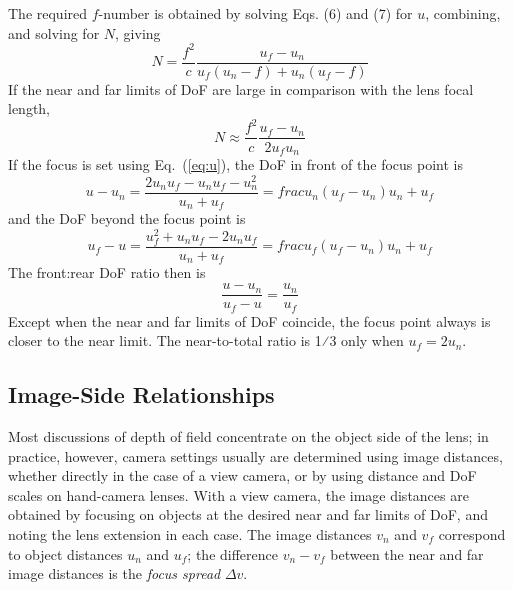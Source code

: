 \documentclass[11pt, oneside]{scrartcl}   	%
\newcommand{\Dv}{\ensuremath{\Delta v}}
\begin{document}
The required $f$-number is obtained by solving Eqs. (6) and (7) for
$u$, combining, and solving for $N$, giving
\begin{equation}
  \label{eq:N}
  N = \frac{f^2}c\frac{u_f - u_n}{u_f(u_n-f)+u_n(u_f-f)}
\end{equation}
If the near and far limits of DoF are large in comparison with the lens focal length,
\begin{equation}
  \label{eq:Napprox}
  N\approx \frac{f^2}c\frac{u_f - u_n}{2u_fu_n}
\end{equation}
If the focus is set using Eq.~(\ref{eq:u}), the DoF in front of the
focus point is
\begin{equation}
  \label{eq:DOFf}
  u-u_n=\frac{2u_nu_f-u_nu_f-u_n^2}{u_n + u_f} = frac{u_n(u_f - u_n)}{u_n + u_f}
\end{equation}
and the DoF beyond the focus point is
\begin{equation}
  \label{eq:DOFb}
  u_f - u = \frac{u_f^2 +u_nu_f-2u_nu_f}{u_n + u_f} = frac{u_f(u_f - u_n)}{u_n + u_f}
\end{equation}
The front:rear DoF ratio then is
\begin{equation}
  \label{eq:frrat}
  \frac{u - u_n}{u_f - u} = \frac{u_n}{u_f}
\end{equation}
Except when the near and far limits of DoF coincide, the focus point always is closer to the
near limit. The near-to-total ratio is 1⁄3 only when $u_f = 2u_n$.
\subsection{Image-Side Relationships}
Most discussions of depth of field concentrate on the object side of the lens; in practice, however, camera settings usually are determined using image distances, whether directly in the case of a view camera, or by using distance and DoF scales on hand-camera lenses. With a view camera, the image distances are obtained by focusing on objects at the desired near and far limits of DoF, and noting the lens extension in each case. The image distances $v_n$ and $v_f$ correspond to object distances $u_n$ and $u_f$; the difference $v_n-v_f$ between the near and far image distances is the \emph{focus spread} $\Dv$.
\end{document}
